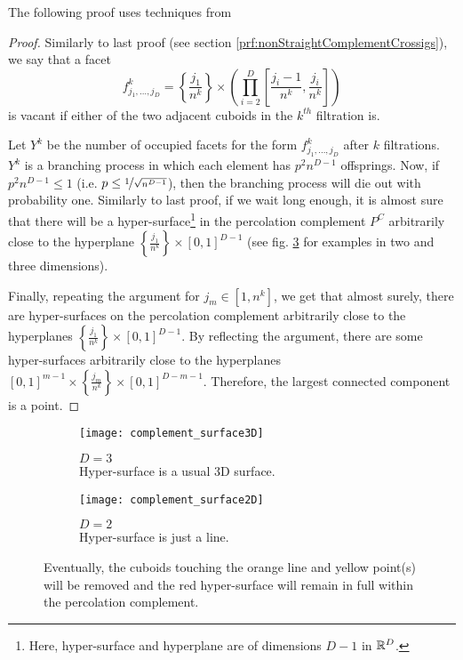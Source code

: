 The following proof uses techniques from \cite[p.310 b.(2)]{Chayes_1988}
\begin{proof}
	Similarly to last proof (see section \ref{prf:nonStraightComplementCrossigs}), we say that a facet 
	$$f_{j_1,\dots,j_D}^k = \left\lbrace \frac{j_1}{n^k} \right\rbrace \times \left( \prod_{i=2}^{D} \left[ \frac{j_i-1}{n^k},\frac{j_i}{n^k} \right] \right) $$
	is vacant if either of the two adjacent cuboids in the $k^{th}$ filtration is.
	
	Let $Y^k$ be the number of occupied facets for the form $f_{j_1,\dots,j_D}^k$ after $k$ filtrations.
	$Y^k$ is a branching process in which each element has $p^2n^{D-1}$ offsprings.
	Now, if $p^2n^{D-1}	\leq 1$ (i.e. $p \leq \nicefrac{1}{\sqrt{n^{D-1}}}$), then the branching process will die out with probability one.
	Similarly to last proof, if we wait long enough, it is almost sure that there will be a hyper-surface\footnote{Here, hyper-surface and hyperplane are of dimensions $D-1$ in $\mathbb{R}^D$.} in the percolation complement $P^C$ arbitrarily close to the hyperplane $\left\lbrace \frac{j_1}{n^k} \right\rbrace \times \left[ 0,1 \right]^{D-1}$ (see fig. \ref{fig:complementSurface} for examples in two and three dimensions).
	
	Finally, repeating the argument for $j_m \in \left[ 1,n^k\right] $, we get that almost surely, there are hyper-surfaces on the percolation complement arbitrarily close to the hyperplanes $\left\lbrace \frac{j_1}{n^k} \right\rbrace \times \left[ 0,1 \right]^{D-1}$.
	By reflecting the argument, there are some hyper-surfaces arbitrarily close to the hyperplanes $\left[ 0,1 \right]^{m-1} \times \left\lbrace \frac{j_m}{n^k} \right\rbrace \times \left[ 0,1 \right]^{D-m-1}$.
	Therefore, the largest connected component is a point.
\end{proof}

\begin{figure}[!h]
	\vspace{-0.75cm}
	\begin{subfigure}{0.44\linewidth}
		\texttt{[image: complement\_surface3D]}
		\centering
		\captionsetup{justification=centering}
		\caption{$D = 3$\\Hyper-surface is a usual 3D surface.}
		\label{fig:complementSurface3D}
	\end{subfigure}
	\hspace{0.1\linewidth}
	\begin{subfigure}{0.44\linewidth}
		\texttt{[image: complement\_surface2D]}
		\centering
		\captionsetup{justification=centering}
		\caption{$D = 2$\\Hyper-surface is just a line.}
		\label{fig:complementSurface2D}
	\end{subfigure}
	\centering
	\caption{Eventually, the cuboids touching the orange line and yellow point(s) will be removed and the red hyper-surface will remain in full within the percolation complement.}
	\label{fig:complementSurface}
\end{figure}

